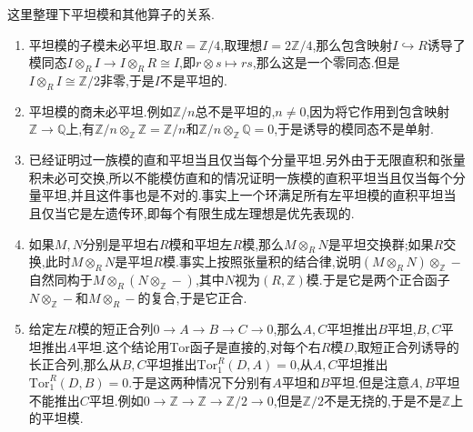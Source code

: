 这里整理下平坦模和其他算子的关系.
\begin{enumerate}
	\item 平坦模的子模未必平坦.取$R=\mathbb{Z}/4$,取理想$I=2\mathbb{Z}/4$,那么包含映射$I\hookrightarrow R$诱导了模同态$I\otimes_RI\to I\otimes_RR\cong I$,即$r\otimes s\mapsto rs$,那么这是一个零同态.但是$I\otimes_RI\cong\mathbb{Z}/2$非零,于是$I$不是平坦的.
	\item 平坦模的商未必平坦.例如$\mathbb{Z}/n$总不是平坦的,$n\not=0$,因为将它作用到包含映射$\mathbb{Z}\to\mathbb{Q}$上,有$\mathbb{Z}/n\otimes_{\mathbb{Z}}\mathbb{Z}=\mathbb{Z}/n$和$\mathbb{Z}/n\otimes_{\mathbb{Z}}\mathbb{Q}=0$,于是诱导的模同态不是单射.
	\item 已经证明过一族模的直和平坦当且仅当每个分量平坦.另外由于无限直积和张量积未必可交换,所以不能模仿直和的情况证明一族模的直积平坦当且仅当每个分量平坦,并且这件事也是不对的.事实上一个环满足所有左平坦模的直积平坦当且仅当它是左遗传环,即每个有限生成左理想是优先表现的.
	\item 如果$M,N$分别是平坦右$R$模和平坦左$R$模,那么$M\otimes_RN$是平坦交换群;如果$R$交换,此时$M\otimes_RN$是平坦$R$模.事实上按照张量积的结合律,说明$(M\otimes_RN)\otimes_{\mathbb{Z}}-$自然同构于$M\otimes_R(N\otimes_{\mathbb{Z}}-)$,其中$N$视为$(R,\mathbb{Z})$模.于是它是两个正合函子$N\otimes_{\mathbb{Z}}-$和$M\otimes_R-$的复合,于是它正合.
	\item 给定左$R$模的短正合列$0\to A\to B\to C\to0$,那么$A,C$平坦推出$B$平坦,$B,C$平坦推出$A$平坦.这个结论用$\mathrm{Tor}$函子是直接的,对每个右$R$模$D$,取短正合列诱导的长正合列,那么从$B,C$平坦推出$\mathrm{Tor}_1^R(D,A)=0$,从$A,C$平坦推出$\mathrm{Tor}_1^R(D,B)=0$.于是这两种情况下分别有$A$平坦和$B$平坦.但是注意$A,B$平坦不能推出$C$平坦.例如$0\to\mathbb{Z}\to\mathbb{Z}\to\mathbb{Z}/2\to0$,但是$\mathbb{Z}/2$不是无挠的,于是不是$\mathbb{Z}$上的平坦模.
\end{enumerate}

